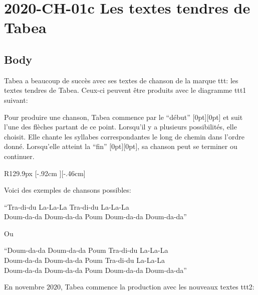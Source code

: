 \documentclass[a4paper,11pt]{report}
\newcommand{\taskGraphicsFolder}{..}
\begin{document}
\section*{\centering{} 2020-CH-01c Les textes tendres de Tabea}


\subsection*{Body}

Tabea a beaucoup de succès avec ses textes de chanson de la marque ttt: les textes tendres de Tabea. Ceux-ci peuvent être produits avec le diagramme ttt1 suivant:

{\centering%
\par}

Pour produire une chanson, Tabea commence par le “début” \raisebox{-0.5ex}[0pt][0pt]{} et suit l’une des flèches partant de ce point. Lorsqu’il y a plusieurs possibilités, elle choisit. Elle chante les syllabes correspondantes le long de chemin dans l’ordre donné. Lorsqu’elle atteint la “fin” \raisebox{-0.5ex}[0pt][0pt]{}, sa chanson peut se terminer ou continuer.

\begin{wrapfigure}{R}{129.9px}
\raisebox{-.46cm}[\dimexpr \height-.92cm \relax][-.46cm]{}
\end{wrapfigure}

Voici des exemples de chansons possibles:

“Tra-di-du La-La-La Tra-di-du La-La-La \\
Doum-da-da Doum-da-da Poum Doum-da-da Doum-da-da”

Ou

“Doum-da-da Doum-da-da Poum Tra-di-du La-La-La \\
Doum-da-da Doum-da-da Poum Tra-di-du La-La-La \\
Doum-da-da Doum-da-da Poum Doum-da-da Doum-da-da”

En novembre $2020$, Tabea commence la production avec les nouveaux textes ttt2:

{\centering%
\par}
\end{document}
